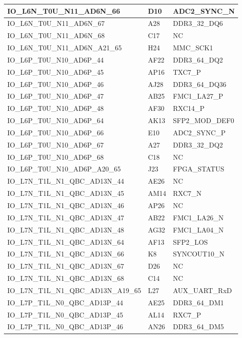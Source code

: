 \begin{footnotesize}
\begin{longtable}{|p{7cm}|p{1cm}|p{5cm}|}
IO\_L6N\_T0U\_N11\_AD6N\_66	&	D10	&	ADC2\_SYNC\_N	\\ \hline
IO\_L6N\_T0U\_N11\_AD6N\_67	&	A28	&	DDR3\_32\_DQ6	\\ \hline
IO\_L6N\_T0U\_N11\_AD6N\_68	&	C17	&	NC	\\ \hline
IO\_L6N\_T0U\_N11\_AD6N\_A21\_65	&	H24	&	MMC\_SCK1	\\ \hline
IO\_L6P\_T0U\_N10\_AD6P\_44	&	AF22	&	DDR3\_64\_DQ2	\\ \hline
IO\_L6P\_T0U\_N10\_AD6P\_45	&	AP16	&	TXC7\_P	\\ \hline
IO\_L6P\_T0U\_N10\_AD6P\_46	&	AJ28	&	DDR3\_64\_DQ36	\\ \hline
IO\_L6P\_T0U\_N10\_AD6P\_47	&	AB25	&	FMC1\_LA27\_P	\\ \hline
IO\_L6P\_T0U\_N10\_AD6P\_48	&	AF30	&	RXC14\_P	\\ \hline
IO\_L6P\_T0U\_N10\_AD6P\_64	&	AK13	&	SFP2\_MOD\_DEF0	\\ \hline
IO\_L6P\_T0U\_N10\_AD6P\_66	&	E10	&	ADC2\_SYNC\_P	\\ \hline
IO\_L6P\_T0U\_N10\_AD6P\_67	&	A27	&	DDR3\_32\_DQ2	\\ \hline
IO\_L6P\_T0U\_N10\_AD6P\_68	&	C18	&	NC	\\ \hline
IO\_L6P\_T0U\_N10\_AD6P\_A20\_65	&	J23	&	FPGA\_STATUS	\\ \hline
IO\_L7N\_T1L\_N1\_QBC\_AD13N\_44	&	AE26	&	NC	\\ \hline
IO\_L7N\_T1L\_N1\_QBC\_AD13N\_45	&	AM14	&	RXC7\_N	\\ \hline
IO\_L7N\_T1L\_N1\_QBC\_AD13N\_46	&	AP26	&	NC	\\ \hline
IO\_L7N\_T1L\_N1\_QBC\_AD13N\_47	&	AB22	&	FMC1\_LA26\_N	\\ \hline
IO\_L7N\_T1L\_N1\_QBC\_AD13N\_48	&	AG32	&	FMC1\_LA04\_N	\\ \hline
IO\_L7N\_T1L\_N1\_QBC\_AD13N\_64	&	AF13	&	SFP2\_LOS	\\ \hline
IO\_L7N\_T1L\_N1\_QBC\_AD13N\_66	&	K8	&	SYNCOUT10\_N	\\ \hline
IO\_L7N\_T1L\_N1\_QBC\_AD13N\_67	&	D26	&	NC	\\ \hline
IO\_L7N\_T1L\_N1\_QBC\_AD13N\_68	&	C14	&	NC	\\ \hline
IO\_L7N\_T1L\_N1\_QBC\_AD13N\_A19\_65	&	L27	&	AUX\_UART\_RxD	\\ \hline
IO\_L7P\_T1L\_N0\_QBC\_AD13P\_44	&	AE25	&	DDR3\_64\_DM1	\\ \hline
IO\_L7P\_T1L\_N0\_QBC\_AD13P\_45	&	AL14	&	RXC7\_P	\\ \hline
IO\_L7P\_T1L\_N0\_QBC\_AD13P\_46	&	AN26	&	DDR3\_64\_DM5	\\ \hline

\end{longtable}
\end{footnotesize}

